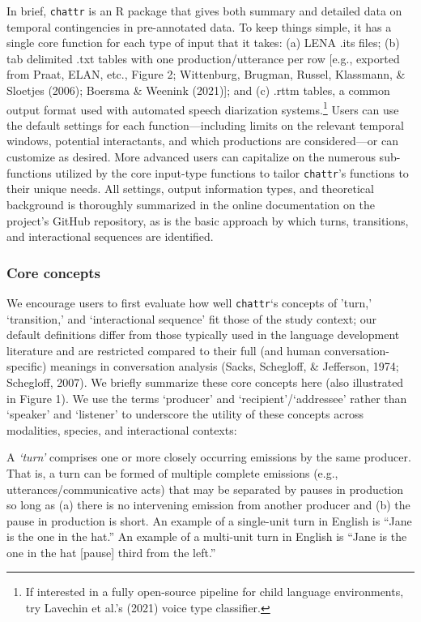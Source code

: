 \documentclass[10pt, letterpaper]{article}
\begin{document}
In brief, \texttt{chattr} is an R package that gives both summary and
detailed data on temporal contingencies in pre-annotated data. To keep
things simple, it has a single core function for each type of input that
it takes: (a) LENA .its files; (b) tab delimited .txt tables with one
production/utterance per row {[}e.g., exported from Praat, ELAN, etc.,
Figure 2; Wittenburg, Brugman, Russel, Klassmann, \& Sloetjes (2006);
Boersma \& Weenink (2021){]}; and (c) .rttm tables, a common output
format used with automated speech diarization systems.\footnote{If
  interested in a fully open-source pipeline for child language
  environments, try Lavechin et al.'s (2021) voice type classifier.}
Users can use the default settings for each function---including limits
on the relevant temporal windows, potential interactants, and which
productions are considered---or can customize as desired. More advanced
users can capitalize on the numerous sub-functions utilized by the core
input-type functions to tailor \texttt{chattr}'s functions to their
unique needs. All settings, output information types, and theoretical
background is thoroughly summarized in the online documentation on the
project's GitHub repository, as is the basic approach by which turns,
transitions, and interactional sequences are identified.

\hypertarget{core-concepts}{%
\subsubsection{Core concepts}\label{core-concepts}}

We encourage users to first evaluate how well \texttt{chattr}`s concepts
of 'turn,' `transition,' and `interactional sequence' fit those of the
study context; our default definitions differ from those typically used
in the language development literature and are restricted compared to
their full (and human conversation-specific) meanings in conversation
analysis (Sacks, Schegloff, \& Jefferson, 1974; Schegloff, 2007). We
briefly summarize these core concepts here (also illustrated in Figure
1). We use the terms `producer' and `recipient'/`addressee' rather than
`speaker' and `listener' to underscore the utility of these concepts
across modalities, species, and interactional contexts:

A \emph{`turn'} comprises one or more closely occurring emissions by the
same producer. That is, a turn can be formed of multiple complete
emissions (e.g., utterances/communicative acts) that may be separated by
pauses in production so long as (a) there is no intervening emission
from another producer and (b) the pause in production is short. An
example of a single-unit turn in English is ``Jane is the one in the
hat.'' An example of a multi-unit turn in English is ``Jane is the one
in the hat {[}pause{]} third from the left.''
\end{document}
